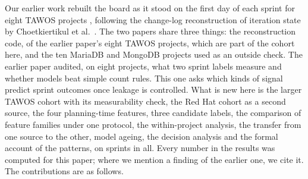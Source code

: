 Our earlier work \cite{abusharkh2027} rebuilt the board as it stood on the first day of each sprint for eight TAWOS projects \cite{tawos}, following the change-log reconstruction of iteration state by Choetkiertikul et al.\ \cite{choet2018}. The two papers share three things: the reconstruction code, \DevProj{} of the earlier paper's eight TAWOS projects, which are part of the cohort here, and the ten MariaDB and MongoDB projects used as an outside check. The earlier paper audited, on eight projects, what two sprint labels measure and whether models beat simple count rules. This one asks which kinds of signal predict sprint outcomes once leakage is controlled. What is new here is the larger TAWOS cohort with its measurability check, the Red Hat cohort as a second source, the four planning-time features, three candidate labels, the comparison of feature families under one protocol, the within-project analysis, the transfer from one source to the other, model ageing, the decision analysis and the formal account of the patterns, on \BothSprints{} sprints in all. Every number in the results was computed for this paper; where we mention a finding of the earlier one, we cite it. The contributions are as follows.
